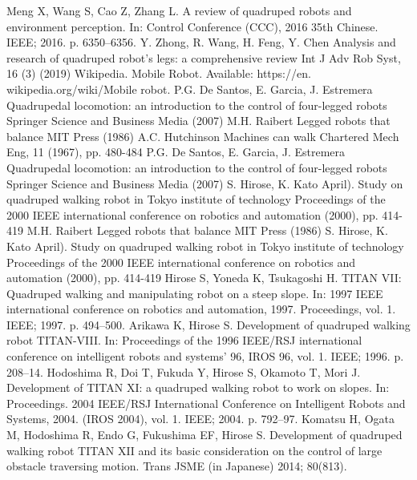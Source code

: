 \documentclass[12pt,a4paper]{ctexart}
\begin{document}
\begin{thebibliography}{99}
    \setlength{\parskip}{0pt}

     Meng X, Wang S, Cao Z, Zhang L. A review of quadruped robots and environment perception. In: Control Conference (CCC), 2016 35th Chinese. IEEE; 2016. p. 6350–6356.
     Y. Zhong, R. Wang, H. Feng, Y. Chen
    Analysis and research of quadruped robot’s legs: a comprehensive review
    Int J Adv Rob Syst, 16 (3) (2019)
     Wikipedia. Mobile Robot. Available: https://en. wikipedia.org/wiki/Mobile robot.
     P.G. De Santos, E. Garcia, J. Estremera
    Quadrupedal locomotion: an introduction to the control of four-legged robots
    Springer Science and Business Media (2007)
     M.H. Raibert
    Legged robots that balance
    MIT Press (1986)
     A.C. Hutchinson
    Machines can walk
    Chartered Mech Eng, 11 (1967), pp. 480-484
     P.G. De Santos, E. Garcia, J. Estremera
    Quadrupedal locomotion: an introduction to the control of four-legged robots
    Springer Science and Business Media (2007)
     S. Hirose, K. Kato
    April). Study on quadruped walking robot in Tokyo institute of technology
    Proceedings of the 2000 IEEE international conference on robotics and automation (2000), pp. 414-419
     M.H. Raibert
    Legged robots that balance
    MIT Press (1986)
     S. Hirose, K. Kato
    April). Study on quadruped walking robot in Tokyo institute of technology
    Proceedings of the 2000 IEEE international conference on robotics and automation (2000), pp. 414-419
     Hirose S, Yoneda K, Tsukagoshi H. TITAN VII: Quadruped walking and manipulating robot on a steep slope. In: 1997 IEEE international conference on robotics and automation, 1997. Proceedings, vol. 1. IEEE; 1997. p. 494–500.
     Arikawa K, Hirose S. Development of quadruped walking robot TITAN-VIII. In: Proceedings of the 1996 IEEE/RSJ international conference on intelligent robots and systems' 96, IROS 96, vol. 1. IEEE; 1996. p. 208–14.
     Hodoshima R, Doi T, Fukuda Y, Hirose S, Okamoto T, Mori J. Development of TITAN XI: a quadruped walking robot to work on slopes. In: Proceedings. 2004 IEEE/RSJ International Conference on Intelligent Robots and Systems, 2004. (IROS 2004), vol. 1. IEEE; 2004. p. 792–97.
     Komatsu H, Ogata M, Hodoshima R, Endo G, Fukushima EF, Hirose S. Development of quadruped walking robot TITAN XII and its basic consideration on the control of large obstacle traversing motion. Trans JSME (in Japanese) 2014; 80(813).

\end{thebibliography}
\end{document}
